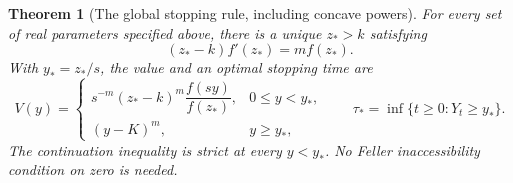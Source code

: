 \documentclass[11pt,a4paper]{article}
\newtheorem{theorem}{Theorem}[section]
\theoremstyle{definition}
\theoremstyle{remark}
\numberwithin{equation}{section}
\begin{document}
\begin{theorem}[The global stopping rule, including concave powers]
\label{p1:stp:verification}
For every set of real parameters specified above, there is a unique
$z_*>k$ satisfying
\begin{equation}\label{p1:stp:contact}
 (z_*-k)f'(z_*)=mf(z_*).
\end{equation}
With $y_*=z_*/s$, the value and an optimal stopping time are
\begin{equation}\label{p1:stp:solution}
 V(y)=
 \begin{cases}
 s^{-m}(z_*-k)^m\dfrac{f(sy)}{f(z_*)},&0\le y<y_*,\\[5pt]
 (y-K)^m,&y\ge y_*,
 \end{cases}
 \qquad
 \tau_* =\inf\{t\ge0:Y_t\ge y_*\}.
\end{equation}
The continuation inequality is strict at every $y<y_*$.  No Feller
inaccessibility condition on zero is needed.
\end{theorem}
\end{document}
